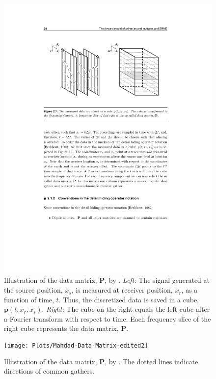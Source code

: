\begin{figure}
    \centering
	\includegraphics{Plots/P-Groenestijn_2010}
	\caption{Illustration of the data matrix, $\mathbf{P}$, by \citet{Groenestijn_2010}. \textit{Left:} The signal generated at the source position, $x_s$, is measured at receiver position, $x_r$, as a function of time, $t$. Thus, the discretized data is saved in a cube, $\mathbf{p}(t,x_r,x_s)$. \textit{Right:} The cube on the right equals the left cube after a Fourier transform with respect to time. Each frequency slice of the right cube represents the data matrix, $\mathbf{P}$.}
	\label{fig:Ch-Theory-DataMatrix}
\end{figure}


\begin{figure}
    \centering
	\texttt{[image: Plots/Mahdad-Data-Matrix-edited2]}
	\caption{Illustration of the data matrix, $\mathbf{P}$, by \cite{Mahdad-Deblending-Method}. The dotted lines indicate directions of common gathers.}
	\label{fig:Ch-Theory-DataMatrixMahdad}
\end{figure}

